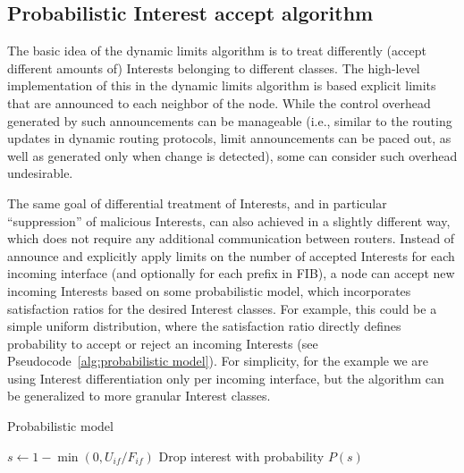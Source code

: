 \subsection{Probabilistic Interest accept algorithm}
\label{sec:probabilistic}

The basic idea of the dynamic limits algorithm is to treat differently (accept different amounts of) Interests belonging to different classes.
The high-level implementation of this in the dynamic limits algorithm is based explicit limits that are announced to each neighbor of the node.
While the control overhead generated by such announcements can be manageable (i.e., similar to the routing updates in dynamic routing protocols, limit announcements can be paced out, as well as generated only when change is detected), some can consider such overhead undesirable.

The same goal of differential treatment of Interests, and in particular ``suppression'' of malicious Interests, can also achieved in a slightly different way, which does not require any additional communication between routers.
Instead of announce and explicitly apply limits on the number of accepted Interests for each incoming interface (and optionally for each prefix in FIB), a node can accept new incoming Interests based on some probabilistic model, which incorporates satisfaction ratios for the desired Interest classes.
For example, this could be a simple uniform distribution, where the satisfaction ratio directly defines probability to accept or reject an incoming Interests (see Pseudocode~\ref{alg:probabilistic model}).
For simplicity, for the example we are using Interest differentiation only per incoming interface, but the algorithm can be generalized to more granular Interest classes.



\begin{algorithm}[h]
\caption{Probabilistic model}
\label{alg:probabilistic model}
\begin{algorithmic}[1]


    \State{} 
    \State{} 
    
         
            \State $s \leftarrow 1 - \min(0, U_{if} / F_{if})$
            \State Drop interest with probability $P(s)$
        \EndIf

    \EndFor
\EndFunction

\end{algorithmic}
\end{algorithm}

